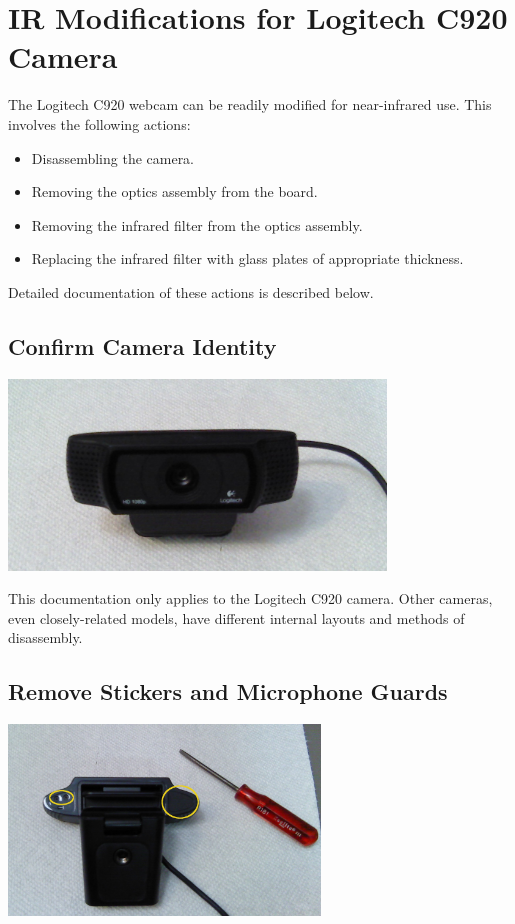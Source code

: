 
\chapter{IR Modifications for Logitech C920 Camera}
\label{c920}

The Logitech C920 webcam can be readily modified for near-infrared use. This
involves the following actions:
\begin{itemize}
\item Disassembling the camera.
\item Removing the optics assembly from the board.
\item Removing the infrared filter from the optics assembly.
\item Replacing the infrared filter with glass plates of appropriate
thickness.
\end{itemize}

Detailed documentation of these actions is described below.

\section{Confirm Camera Identity}

\includegraphics[height=2in]{pics-c920/01-start.jpg}

This documentation only applies to the Logitech C920 camera. Other cameras,
even closely-related models, have different internal layouts and methods of
disassembly.

\section{Remove Stickers and Microphone Guards}

\includegraphics[height=2in]{pics-c920/02-bottomscrews.jpg}


